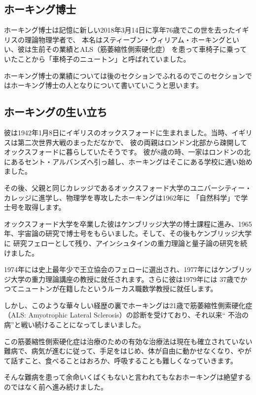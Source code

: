 \documentclass[10pt,b5paper,papersize,dvipdfmx]{jsbook}
\begin{document}
\subsection{ホーキング博士}
ホーキング博士は記憶に新しい2018年3月14日に享年76歳でこの世を去ったイギリスの理論物理学者で、
本名はスティーブン・ウィリアム・ホーキングといい、彼は生前その業績とALS（筋萎縮性側索硬化症）
を患って車椅子に乗っていたことから「車椅子のニュートン」と呼ばれていました。\par
ホーキング博士の業績については後のセクションでふれるのでこのセクションではホーキング博士の人となりについて書いていこうと思います。\par

\subsection{ホーキングの生い立ち}
彼は1942年1月8日にイギリスのオックスフォードに生まれました。当時、イギリスは第二次世界大戦のまっただなかで、
彼の両親はロンドン北部から疎開してオックスフォードに暮らしていたそうです。
彼が8歳の時、一家はロンドンの北にあるセント・アルバンズへ引っ越し、ホーキングはそこにある学校に通い始めました。\par
その後、父親と同じカレッジであるオックスフォード大学のユニバーシティー・カレッジに進学し、物理学を専攻したホーキングは1962年に
「自然科学」で学士号を取得します。\par
オックスフォード大学を卒業した彼はケンブリッジ大学の博士課程に進み、1965年、宇宙論の研究で博士号をもらいました。そして、その後もケンブリッジ大学に
研究フェローとして残り、アインシュタインの重力理論と量子論の研究を続けました。\par
1974年には史上最年少で王立協会のフェローに選出され、1977年にはケンブリッジ大学の重力理論講座の教授に就任されます。さらに彼は1979年には
37歳でかつてニュートンが在籍したというルーカス職数学教授に就任します。\par
しかし、このような華々しい経歴の裏でホーキングは21歳で筋萎縮性側索硬化症（ALS: Amyotrophic Lateral Sclerosis）の診断を受けており、それ以来“
不治の病”と戦い続けることになってしまいました。\par
この筋萎縮性側索硬化症は治療のための有効な治療法は現在も確立されていない難病で、病気が進むに従って、手足をはじめ、体が自由に動かせなくなり、やがて話すこと、食べることはおろか、呼吸することも難しくなっていきます。\par
そんな難病を患って余命いくばくもないと言われてもなおホーキングは絶望するのではなく前へ進み続けました。
\end{document}
